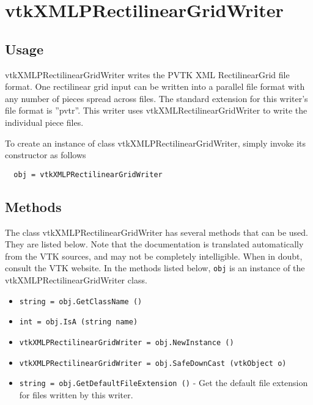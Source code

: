 \section{vtkXMLPRectilinearGridWriter}

\subsection{Usage}

 vtkXMLPRectilinearGridWriter writes the PVTK XML RectilinearGrid
 file format.  One rectilinear grid input can be written into a
 parallel file format with any number of pieces spread across files.
 The standard extension for this writer's file format is ''pvtr''.
 This writer uses vtkXMLRectilinearGridWriter to write the
 individual piece files.

To create an instance of class vtkXMLPRectilinearGridWriter, simply
invoke its constructor as follows
\begin{verbatim}
  obj = vtkXMLPRectilinearGridWriter
\end{verbatim}
\subsection{Methods}

The class vtkXMLPRectilinearGridWriter has several methods that can be used.
  They are listed below.
Note that the documentation is translated automatically from the VTK sources,
and may not be completely intelligible.  When in doubt, consult the VTK website.
In the methods listed below, \verb|obj| is an instance of the vtkXMLPRectilinearGridWriter class.
\begin{itemize}
\item  \verb|string = obj.GetClassName ()|

\item  \verb|int = obj.IsA (string name)|

\item  \verb|vtkXMLPRectilinearGridWriter = obj.NewInstance ()|

\item  \verb|vtkXMLPRectilinearGridWriter = obj.SafeDownCast (vtkObject o)|

\item  \verb|string = obj.GetDefaultFileExtension ()| -  Get the default file extension for files written by this writer.

\end{itemize}
